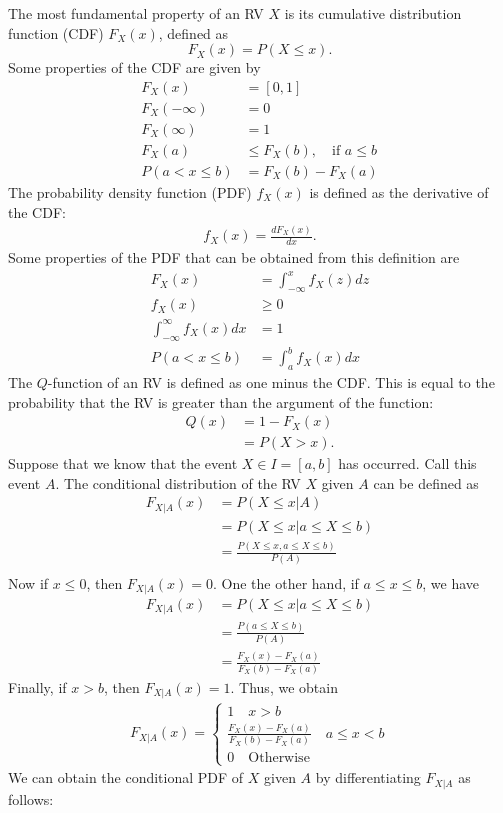 The most fundamental property of an RV $X$ is its cumulative distribution function (CDF) $F_X(x)$, defined as 
$$F_{X}(x) = P(X\leq x).$$
Some properties of the CDF are given by
\begin{align*}
	F_X(x)&= [0,1]\\
	F_X(-\infty)&= 0\\
	F_X(\infty)&= 1\\
	F_X(a)&\leq F_X(b), \quad \text{if }a\leq b \\
	P(a<x\leq b)&=F_X(b)-F_X(a)
\end{align*}
The probability density function (PDF) $f_X(x)$ is defined as the derivative of the CDF:
\begin{align*}
	f_X(x) = \frac{dF_X(x)}{dx}.
\end{align*}
Some properties of the PDF that can be obtained from this definition are
\begin{align*}
	F_X(x) &= \int_{-\infty}^xf_X(z)dz\\
	f_X(x)&\geq 0\\
	\int_{-\infty}^{\infty}f_X(x)dx&= 1\\
	P(a<x\leq b)&=\int_{a}^bf_X(x)dx
\end{align*}
The $Q$-function of an RV is defined as one minus the CDF. This is equal to the probability that the RV is greater than the argument of the function: 
\begin{align*}
	Q(x)&= 1-F_X(x)\\
		&= P(X>x).
\end{align*}
Suppose that we know that the event $X\in I=[a,b]$ has occurred. Call this event $A$. The conditional distribution of the RV $X$ given $A$ can be defined as
\begin{align*}
	F_{X|A}(x)&= P(X\leq x|A)\\
			&= P(X\leq x|a\leq X \leq b)\\
			&= \frac{P(X\leq x,a\leq X \leq b)}{P(A)}\\
\end{align*}
Now if $x\leq 0$, then $F_{X|A}(x)=0$. One the other hand, if $a\leq x \leq b$, we have
\begin{align*}
	F_{X|A}(x)&= P(X\leq x|a\leq X \leq b)\\
			&= \frac{P(a\leq X \leq b)}{P(A)}\\
			&= \frac{F_X(x)-F_X(a)}{F_X(b)-F_X(a)}
\end{align*}
Finally, if $x>b$, then $F_{X|A}(x)=1$. Thus, we obtain
\begin{align*}
F_{X|A}(x)=
	\begin{cases}
	1\quad x>b\\	
	\frac{F_X(x)-F_X(a)}{F_X(b)-F_X(a)}\quad a\leq x <b\\	
	0\quad \text{Otherwise}\
	\end{cases}
\end{align*}
We can obtain the conditional PDF of $X$ given $A$ by differentiating $F_{X|A}$ as follows:

